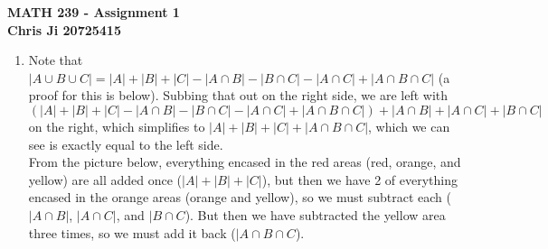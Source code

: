 \documentclass[10pt,english]{article}
\begin{document}
\noindent \begin{center}
\textbf{\large{}MATH 239 - Assignment 1}\\
\textbf{\large{}Chris Ji 20725415}
\par\end{center}{\large \par}
\medskip{}

\begin{enumerate}
\item Note that $|A\cup B\cup C|=|A|+|B|+|C|-|A\cap B|-|B\cap C|-|A\cap C|+|A\cap B\cap C|$ (a proof for this is below). Subbing that out on the right side, we are left with $\left(|A|+|B|+|C|-|A\cap B|-|B\cap C|-|A\cap C|+|A\cap B\cap C|\right)+|A\cap B|+|A\cap C|+|B\cap C|$ on the right, which simplifies to $|A|+|B|+|C|+|A\cap B\cap C|$, which we can see is exactly equal to the left side. 
\\ From the picture below, everything encased in the red areas (red, orange, and yellow) are all added once ($|A|+|B|+|C|$), but then we have 2 of everything encased in the orange areas (orange and yellow), so we must subtract each ($|A\cap B|$, $|A\cap C|$, and $|B\cap C$). But then we have subtracted the yellow area three times, so we must add it back ($|A\cap B\cap C$). 

\pagebreak


\end{enumerate}
\end{document}
